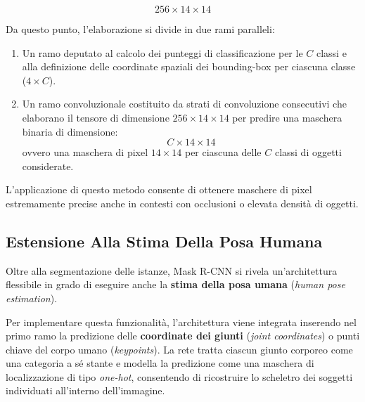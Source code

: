 ﻿\documentclass[11pt, a4paper]{article}
\begin{document}
\[
256 \times 14 \times 14
\]

Da questo punto, l'elaborazione si divide in due rami paralleli:
\begin{enumerate}
    \item Un ramo deputato al calcolo dei punteggi di classificazione per le $C$ classi e alla definizione delle coordinate spaziali dei bounding-box per ciascuna classe ($4 \times C$).
    \item Un ramo convoluzionale costituito da strati di convoluzione consecutivi che elaborano il tensore di dimensione $256 \times 14 \times 14$ per predire una maschera binaria di dimensione:
    \[
    C \times 14 \times 14
    \]
    ovvero una maschera di pixel $14 \times 14$ per ciascuna delle $C$ classi di oggetti considerate.
\end{enumerate}


L'applicazione di questo metodo consente di ottenere maschere di pixel estremamente precise anche in contesti con occlusioni o elevata densità di oggetti.


\newpage

\subsection{Estensione Alla Stima Della Posa Humana}

Oltre alla segmentazione delle istanze, Mask R-CNN si rivela un'architettura flessibile in grado di eseguire anche la \textbf{stima della posa umana} (\emph{human pose estimation}).

Per implementare questa funzionalità, l'architettura viene integrata inserendo nel primo ramo la predizione delle \textbf{coordinate dei giunti} (\emph{joint coordinates}) o punti chiave del corpo umano (\emph{keypoints}). La rete tratta ciascun giunto corporeo come una categoria a sé stante e modella la predizione come una maschera di localizzazione di tipo \emph{one-hot}, consentendo di ricostruire lo scheletro dei soggetti individuati all'interno dell'immagine.

\end{document}

